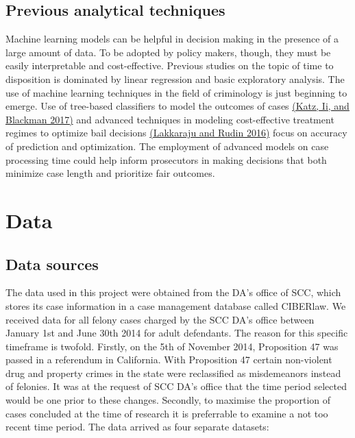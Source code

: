 \documentclass{AISB2008}
\begin{document}
\subsection{Previous analytical techniques}

Machine learning models can be helpful in decision making in the presence of a large amount of data. To be adopted by policy makers, though, they must be easily interpretable and cost-effective. Previous studies on the topic of time to disposition is dominated by linear regression and basic exploratory analysis. The use of machine learning techniques in the field of criminology is just beginning to emerge. Use of tree-based classifiers to model the outcomes of cases \hyperref[csl:1]{(Katz, Ii, and Blackman 2017)} and advanced techniques in modeling cost-effective treatment regimes to optimize bail decisions \hyperref[csl:2]{(Lakkaraju and Rudin 2016)} focus on accuracy of prediction and optimization. The employment of advanced models on case processing time could help inform prosecutors in making decisions that both minimize case length and prioritize fair outcomes.


\section{Data}\label{data}

\subsection{Data sources}\label{data-sources}

The data used in this project were obtained from the DA's office of SCC,
which stores its case information in a case management database called
CIBERlaw. We received data for all felony cases charged by the SCC DA's
office between January 1st and June 30th 2014 for adult defendants. The
reason for this specific timeframe is twofold. Firstly, on the 5th of
November 2014, Proposition 47 was passed in a referendum in California.
With Proposition 47 certain non-violent drug and property crimes in the
state were reclassified as misdemeanors instead of felonies. It was at
the request of SCC DA's office that the time period selected would be
one prior to these changes. Secondly, to maximise the proportion of
cases concluded at the time of research it is preferrable to examine a
not too recent time period. The data arrived as four separate datasets:
\end{document}
